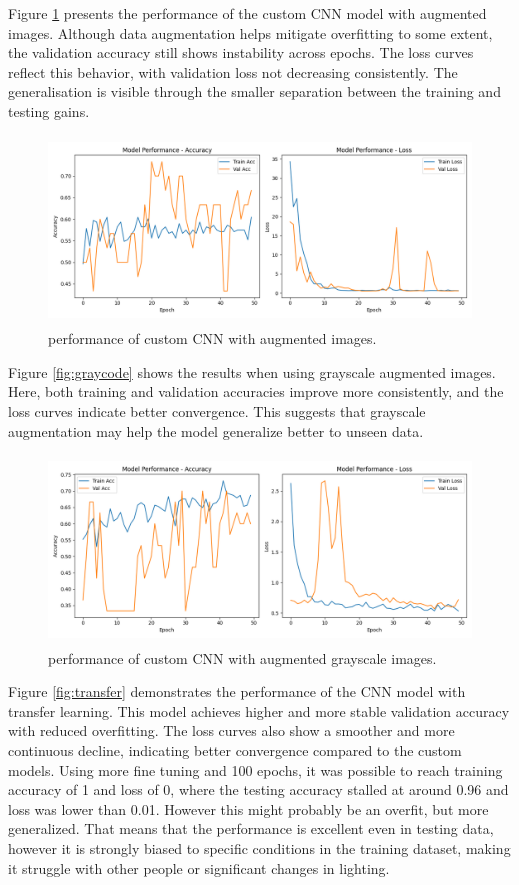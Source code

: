 \documentclass{report}
\begin{document}
Figure \ref{fig:aug} presents the performance of the custom CNN model with augmented images. Although data augmentation helps mitigate overfitting to some extent, the validation accuracy still shows instability across epochs. The loss curves reflect this behavior, with validation loss not decreasing consistently. The generalisation is visible through the smaller separation between the training and testing gains.

\begin{figure}[H]
    \centering
    \includegraphics[height=50mm, keepaspectratio]{report_images/augmentation_performance.png}
    \caption{performance of custom CNN with augmented images.}
    \label{fig:aug}
\end{figure}

Figure \ref{fig:graycode} shows the results when using grayscale augmented images. Here, both training and validation accuracies improve more consistently, and the loss curves indicate better convergence. This suggests that grayscale augmentation may help the model generalize better to unseen data.

\begin{figure}[H]
    \centering
    \includegraphics[height=50mm, keepaspectratio]{report_images/aug_gray_performance.png}
    \caption{performance of custom CNN with augmented grayscale images.}
    \label{fig:grayAug}
\end{figure}

Figure \ref{fig:transfer} demonstrates the performance of the CNN model with transfer learning. This model achieves higher and more stable validation accuracy with reduced overfitting. The loss curves also show a smoother and more continuous decline, indicating better convergence compared to the custom models. Using more fine tuning and 100 epochs, it was possible to reach training accuracy of 1 and loss of 0, where the testing accuracy stalled at around 0.96 and loss was lower than 0.01. However this might probably be an overfit, but more generalized. That means that the performance is excellent even in testing data, however it is strongly biased to specific conditions in the training dataset, making it struggle with other people or significant changes in lighting.
\end{document}
